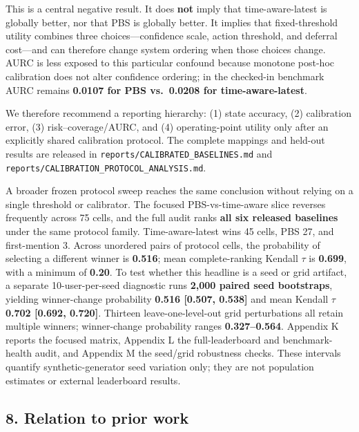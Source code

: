 \documentclass[
  10pt,
  letterpaper,
]{article}
\begin{document}
This is a central negative result. It does \textbf{not} imply that
time-aware-latest is globally better, nor that PBS is globally better.
It implies that fixed-threshold utility combines three
choices---confidence scale, action threshold, and deferral cost---and
can therefore change system ordering when those choices change. AURC is
less exposed to this particular confound because monotone post-hoc
calibration does not alter confidence ordering; in the checked-in
benchmark AURC remains \textbf{0.0107 for PBS vs.~0.0208 for
time-aware-latest}.

We therefore recommend a reporting hierarchy: (1) state accuracy, (2)
calibration error, (3) risk--coverage/AURC, and (4) operating-point
utility only after an explicitly shared calibration protocol. The
complete mappings and held-out results are released in
\texttt{reports/CALIBRATED\_BASELINES.md} and
\texttt{reports/CALIBRATION\_PROTOCOL\_ANALYSIS.md}.

A broader frozen protocol sweep reaches the same conclusion without
relying on a single threshold or calibrator. The focused
PBS-vs-time-aware slice reverses frequently across 75 cells, and the
full audit ranks \textbf{all six released baselines} under the same
protocol family. Time-aware-latest wins 45 cells, PBS 27, and
first-mention 3. Across unordered pairs of protocol cells, the
probability of selecting a different winner is \textbf{0.516}; mean
complete-ranking Kendall \(\tau\) is \textbf{0.699}, with a minimum of
\textbf{0.20}. To test whether this headline is a seed or grid artifact,
a separate 10-user-per-seed diagnostic runs \textbf{2,000 paired seed
bootstraps}, yielding winner-change probability \textbf{0.516 {[}0.507,
0.538{]}} and mean Kendall \(\tau\) \textbf{0.702 {[}0.692, 0.720{]}}.
Thirteen leave-one-level-out grid perturbations all retain multiple
winners; winner-change probability ranges \textbf{0.327--0.564}.
Appendix K reports the focused matrix, Appendix L the full-leaderboard
and benchmark-health audit, and Appendix M the seed/grid robustness
checks. These intervals quantify synthetic-generator seed variation
only; they are not population estimates or external leaderboard results.

\subsection{8. Relation to prior work}\label{relation-to-prior-work}
\end{document}
